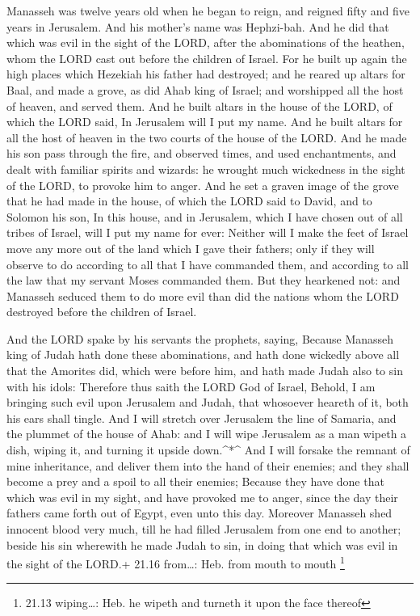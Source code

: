  Manasseh was twelve years old when he began to reign, and
reigned fifty and five years in Jerusalem. And his mother's name was
Hephzi-bah.  And he did that which was evil in the sight of
the LORD, after the abominations of the heathen, whom the LORD cast out
before the children of Israel.  For he built up again the
high places which Hezekiah his father had destroyed; and he reared up
altars for Baal, and made a grove, as did Ahab king of Israel; and
worshipped all the host of heaven, and served them.  And he
built altars in the house of the LORD, of which the LORD said, In
Jerusalem will I put my name.  And he built altars for all
the host of heaven in the two courts of the house of the LORD.
 And he made his son pass through the fire, and observed
times, and used enchantments, and dealt with familiar spirits and
wizards: he wrought much wickedness in the sight of the LORD, to provoke
him to anger.  And he set a graven image of the grove that
he had made in the house, of which the LORD said to David, and to
Solomon his son, In this house, and in Jerusalem, which I have chosen
out of all tribes of Israel, will I put my name for ever: 
Neither will I make the feet of Israel move any more out of the land
which I gave their fathers; only if they will observe to do according to
all that I have commanded them, and according to all the law that my
servant Moses commanded them.  But they hearkened not: and
Manasseh seduced them to do more evil than did the nations whom the LORD
destroyed before the children of Israel.

 And the LORD spake by his servants the prophets, saying,
 Because Manasseh king of Judah hath done these
abominations, and hath done wickedly above all that the Amorites did,
which were before him, and hath made Judah also to sin with his idols:
 Therefore thus saith the LORD God of Israel, Behold, I am
bringing such evil upon Jerusalem and Judah, that whosoever heareth of
it, both his ears shall tingle.  And I will stretch over
Jerusalem the line of Samaria, and the plummet of the house of Ahab: and
I will wipe Jerusalem as a man wipeth a dish, wiping it, and turning it
upside down.\^{}*\^{}  And I will forsake the remnant of
mine inheritance, and deliver them into the hand of their enemies; and
they shall become a prey and a spoil to all their enemies; 
Because they have done that which was evil in my sight, and have
provoked me to anger, since the day their fathers came forth out of
Egypt, even unto this day.  Moreover Manasseh shed innocent
blood very much, till he had filled Jerusalem from one end to another;
beside his sin wherewith he made Judah to sin, in doing that which was
evil in the sight of the LORD.+ 21.16 from\ldots: Heb. from mouth to
mouth \footnote{21.13 wiping\ldots: Heb. he wipeth and turneth it upon
  the face thereof}

